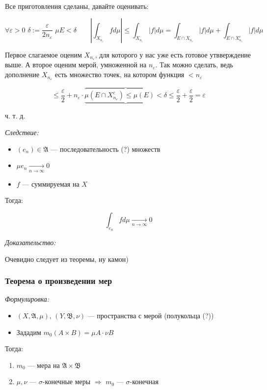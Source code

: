 \documentclass{article}
\def\dbl{\,\,}
\def\goesto#1{\underset{#1}{\longrightarrow}}
\def\toinf#1{\goesto{#1 \rightarrow \infty}}
\def\ntoinf{\toinf{n}}
\begin{document}
Все приготовления сделаны, давайте оценивать:

\[\forall \varepsilon > 0 \dbl \delta := \frac{\varepsilon}{2 n_{\varepsilon}} \dbl \mu E < \delta \qquad \left|\int_{X_{n_\varepsilon}} f d\mu\right| \le \int_{X_{n_\varepsilon}} |f| d\mu = \int_{E \cap X_{n_\varepsilon}} |f| d\mu + \int_{E \cap X^c_{n_{\varepsilon}}} |f| d\mu\]

Первое слагаемое оценим $X_{n_{\varepsilon}}$, для которого у нас уже есть готовое утвверждение выше. А второе оценим мерой, умноженной на $n_\varepsilon$. Так можно сделать, ведь дополнение $X_{n_\varepsilon}$ есть множество точек, на котором функция $< n_{\varepsilon}$

\[\le \frac{\varepsilon}{2} + n_{\varepsilon} \cdot \overbrace{\underbrace{\mu \left( E \cap X^c_{n_{\varepsilon}}\right) \le \mu\left( E \right) < \delta}} \le \frac{\varepsilon}{2} + \frac{\varepsilon}{2} = \varepsilon\]

ч. т. д. 

\textit{Следствие:}
\begin{itemize}
    \item $(e_n) \in \mathfrak{A}$ --- последовательность (?) множеств\
    \item $\mu e_n \ntoinf 0$
    \item $f$ --- суммируемая на $X$
\end{itemize}

Тогда:

\[\int_{e_n} f d \mu \ntoinf 0\]

\textit{Доказательство:}


Очевидно следует из теоремы, ну камон)

\subsubsection{Теорема о произведении мер}
\textit{Формулировка:}

\begin{itemize}
    \item $(X, \mathfrak{A}, \mu)$, $(Y, \mathfrak{B}, \nu)$ --- пространства с мерой (полукольца (?))
    \item Зададим $m_0(A \times B) = \mu A \cdot \nu B$
\end{itemize}

Тогда:

\begin{enumerate}
    \item $m_0$ --- мера на $\mathfrak{A} \times \mathfrak{B}$
    \item $\mu, \nu$ --- $\sigma$-конечные меры $\Longrightarrow$ $m_0$ --- $\sigma$-конечная
\end{enumerate}
\end{document}
